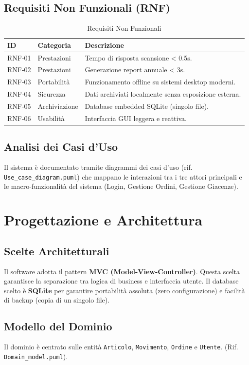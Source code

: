 \documentclass[a4paper,12pt]{article}
\begin{document}
\subsection{Requisiti Non Funzionali (RNF)}
\begin{longtable}{p{} p{} p{}}
\caption{Requisiti Non Funzionali} \\
\toprule
\textbf{ID} & \textbf{Categoria} & \textbf{Descrizione} \\
\midrule
RNF-01 & Prestazioni & Tempo di risposta scansione < 0.5s. \\
RNF-02 & Prestazioni & Generazione report annuale < 3s. \\
RNF-03 & Portabilità & Funzionamento offline su sistemi desktop moderni. \\
RNF-04 & Sicurezza & Dati archiviati localmente senza esposizione esterna. \\
RNF-05 & Archiviazione & Database embedded SQLite (singolo file). \\
RNF-06 & Usabilità & Interfaccia GUI leggera e reattiva. \\
\bottomrule
\end{longtable}

\subsection{Analisi dei Casi d'Uso}
Il sistema è documentato tramite diagrammi dei casi d'uso (rif. \texttt{Use\_case\_diagram.puml}) che mappano le interazioni tra i tre attori principali e le macro-funzionalità del sistema (Login, Gestione Ordini, Gestione Giacenze).

\section{Progettazione e Architettura}
\subsection{Scelte Architetturali}
Il software adotta il pattern \textbf{MVC (Model-View-Controller)}. Questa scelta garantisce la separazione tra logica di business e interfaccia utente. Il database scelto è \textbf{SQLite} per garantire portabilità assoluta (zero configurazione) e facilità di backup (copia di un singolo file).

\subsection{Modello del Dominio}
Il dominio è centrato sulle entità \texttt{Articolo}, \texttt{Movimento}, \texttt{Ordine} e \texttt{Utente}. (Rif. \texttt{Domain\_model.puml}).
\end{document}

